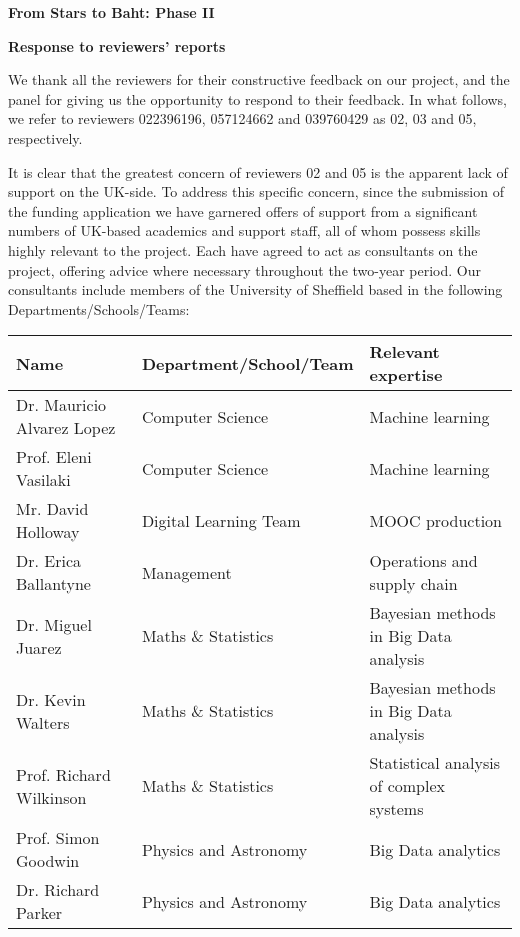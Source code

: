 \documentclass[11pt]{article}
\begin{document}
\setcounter{figure}{0}
\noindent
{\large \bf From Stars to Baht: Phase II}

\noindent
{\large \bf Response to reviewers' reports}

\vspace{2mm}
\noindent
We thank all the reviewers for their constructive feedback on our project, and the panel for giving us the opportunity to respond to their feedback. In what follows, we refer to reviewers 022396196, 057124662 and 039760429 as 02, 03 and 05, respectively.

\vspace{2mm}
\noindent
It is clear that the greatest concern of reviewers 02 and 05 is the apparent lack of support on the UK-side. To address this specific concern, since the submission of the funding application we have garnered offers of support from a significant numbers of UK-based academics and support staff, all of whom possess skills highly relevant to the project. Each have agreed to act as consultants on the project, offering advice where necessary throughout the two-year period. Our consultants include members of the University of Sheffield based in the following Departments/Schools/Teams:
\begin{table}[h]
\begin{tabular}{lll}
  Name & Department/School/Team & Relevant expertise\\
  \hline
  Dr. Mauricio Alvarez Lopez & Computer Science & Machine learning \\
  Prof. Eleni Vasilaki & Computer Science & Machine learning\\
  Mr. David Holloway & Digital Learning Team & MOOC production \\
  Dr. Erica Ballantyne & Management & Operations and supply chain \\
  Dr. Miguel Juarez & Maths \& Statistics & Bayesian methods in Big Data analysis \\
  Dr. Kevin Walters &  Maths \& Statistics & Bayesian methods in Big Data analysis \\
  Prof. Richard Wilkinson & Maths \& Statistics & Statistical analysis of complex systems\\
  Prof. Simon Goodwin & Physics and Astronomy & Big Data analytics \\
  Dr. Richard Parker & Physics and Astronomy & Big Data analytics \\
\hline
\end{tabular}  
\end{table}  
\end{document}
